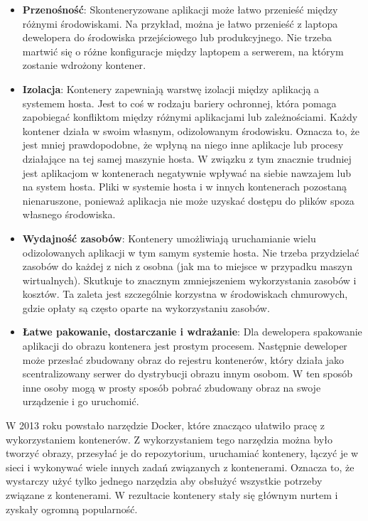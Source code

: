 \begin{itemize}
    \item \textbf{Przenośność}: Skonteneryzowane aplikacji może łatwo przenieść między różnymi środowiskami. Na przykład, można je łatwo przenieść z laptopa dewelopera do środowiska przejściowego lub produkcyjnego. Nie trzeba martwić się o różne konfiguracje między laptopem a serwerem, na którym zostanie wdrożony kontener\cite{dockerContenerizationKeyAndUseCases}\cite{dockerOverview}.
    
    \item \textbf{Izolacja}: Kontenery zapewniają warstwę izolacji między aplikacją a systemem hosta. Jest to coś w rodzaju bariery ochronnej, która pomaga zapobiegać konfliktom między różnymi aplikacjami lub zależnościami. Każdy kontener działa w swoim własnym, odizolowanym środowisku. Oznacza to, że jest mniej prawdopodobne, że wpłyną na niego inne aplikacje lub procesy działające na tej samej maszynie hosta. W związku z tym znacznie trudniej jest aplikacjom w kontenerach negatywnie wpływać na siebie nawzajem lub na system hosta. Pliki w systemie hosta i w innych kontenerach pozostaną nienaruszone, ponieważ aplikacja nie może uzyskać dostępu do plików spoza własnego środowiska\cite{dockerContenerizationKeyAndUseCases}\cite{dockerOverview}.

    \item \textbf{Wydajność zasobów}: Kontenery umożliwiają uruchamianie wielu odizolowanych aplikacji w tym samym systemie hosta. Nie trzeba przydzielać zasobów do każdej z nich z osobna (jak ma to miejsce w przypadku maszyn wirtualnych). Skutkuje to znacznym zmniejszeniem wykorzystania zasobów i kosztów. Ta zaleta jest szczególnie korzystna w środowiskach chmurowych, gdzie opłaty są często oparte na wykorzystaniu zasobów\cite{dockerContenerizationKeyAndUseCases}\cite{dockerOverview}.

    \item \textbf{Łatwe pakowanie, dostarczanie i wdrażanie}: Dla dewelopera spakowanie aplikacji do obrazu kontenera jest prostym procesem. Następnie deweloper może przesłać zbudowany obraz do rejestru kontenerów, który działa jako scentralizowany serwer do dystrybucji obrazu innym osobom. W ten sposób inne osoby mogą w prosty sposób pobrać zbudowany obraz na swoje urządzenie i go uruchomić\cite{dockerContenerizationKeyAndUseCases}\cite{dockerOverview}.
\end{itemize}

W 2013 roku powstało narzędzie Docker, które znacząco ułatwiło pracę z wykorzystaniem kontenerów. Z wykorzystaniem tego narzędzia można było tworzyć obrazy, przesyłać je do repozytorium, uruchamiać kontenery, łączyć je w sieci i wykonywać wiele innych zadań związanych z kontenerami. Oznacza to, że wystarczy użyć tylko jednego narzędzia aby obsłużyć wszystkie potrzeby związane z kontenerami. W rezultacie kontenery stały się głównym nurtem i zyskały ogromną popularność\cite{dockerContenerizationKeyAndUseCases}\cite{dockerOverview}.

